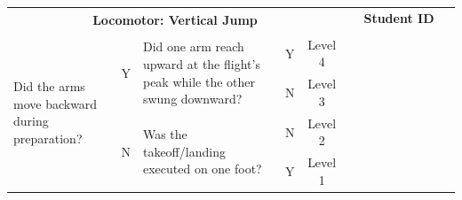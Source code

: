 \documentclass[
  letterpaper,
  DIV=11,
  numbers=noendperiod]{scrartcl}
\begin{document}
\begin{tabular}{|p{5.5cm}|c|p{5.5cm}|c|c|*{9}{p{1.07cm}|}}
\hline
\multicolumn{5}{|c|}{\multirow{2}{*}{\centering \textbf{Locomotor: Vertical Jump}}} & \multicolumn{9}{c|}{\textbf{Student ID}} \\ 
\cline{6-14}
\multicolumn{5}{|c|}{} & & & & & & & & & \\
\hline
\multirow{4}{5.5cm}{\raggedright {\footnotesize Did the arms move backward during preparation?}} 
& \multirow{2}{*}{\footnotesize Y} 
& \multirow{2}{5cm}{\raggedright {\footnotesize Did one arm reach upward at the flight’s peak while the other swung downward?}} & {\footnotesize Y} & {\footnotesize Level 4} & & & & & & & & & \\
\cline{4-14}
& & & {\footnotesize N} & {\footnotesize Level 3} & & & & & & & & & \\
\cline{2-14}
& \multirow{2}{*}{\footnotesize N} & \multirow{2}{5cm}{\raggedright {\footnotesize Was the takeoff/landing executed on one foot?}} & {\footnotesize N} & {\footnotesize Level 2} & & & & & & & & & \\
\cline{4-14}
& & & {\footnotesize Y} & {\footnotesize Level 1} & & & & & & & & & \\
\hline
\end{tabular}

\vspace{.5em}
\end{document}
